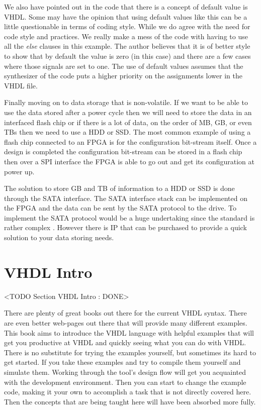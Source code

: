 We also have pointed out in the code that there is a concept of default value is \ac{VHDL}. Some may have the opinion that using default values like this can be a little questionable in terms of coding style. While we do agree with the need for code style and practices. We really make a mess of the code with having to use all the \emph{else} clauses in this example. The author believes that it is of better style to show that by default the value is zero (in this case) and there are a few cases where those signals are set to one. The use of default values assumes that the synthesizer of the code puts a higher priority on the assignments lower in the \ac{VHDL} file. 

Finally moving on to data storage that is non-volatile. If we want to be able to use the data stored after a power cycle then we will need to store the data in an interfaced flash chip or if there is a lot of data, on the order of \ac{MB}, \ac{GB}, or even \ac{TB}s then we need to use a \ac{HDD} or \ac{SSD}. The most common example of using a flash chip connected to an \ac{FPGA} is for the configuration bit-stream itself. Once a design is completed the configuration bit-stream can be stored in a flash chip then over a \ac{SPI} interface the \ac{FPGA} is able to go out and get its configuration at power up. 

The solution to store \ac{GB} and \ac{TB} of information to a \ac{HDD} or \ac{SSD} is done through the \ac{SATA} interface. The \ac{SATA} interface stack can be implemented on the \ac{FPGA} and the data can be sent by the \ac{SATA} protocol to the drive. To implement the \ac{SATA} protocol would be a huge undertaking since the standard is rather complex \cite{sata_std}. However there is \ac{IP} that can be purchased to provide a quick solution to your data storing needs. 	
	
\section{VHDL Intro}
	<TODO Section VHDL Intro : DONE>
	
There are plenty of great books out there for the current \ac{VHDL} syntax. There are even better web-pages out there that will provide many different examples. This book aims to introduce the \ac{VHDL} language with helpful examples that will get you productive at \ac{VHDL} and quickly seeing what you can do with \ac{VHDL}. There is no substitute for trying the examples yourself, but sometimes its hard to get started. If you take these examples and try to compile them yourself and simulate them. Working through the tool's design flow will get you acquainted with the development environment. Then you can start to change the example code, making it your own to accomplish a task that is not directly covered here. Then the concepts that are being taught here will have been absorbed more fully.

